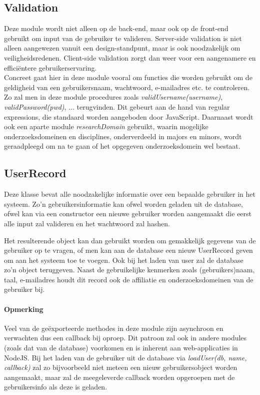\documentclass{article}
\begin{document}
\subsection{Validation}

Deze module wordt niet alleen op de back-end, maar ook op de front-end gebruikt om input van de gebruiker te valideren. Server-side validation is niet alleen aangewezen vanuit een design-standpunt, maar is ook noodzakelijk om veiligheidsredenen. Client-side validation zorgt dan weer voor een aangenamere en effici\"entere gebruikerservaring. \\

Concreet gaat hier in deze module vooral om functies die worden gebruikt om de geldigheid van een gebruikersnaam, wachtwoord, e-mailadres etc. te controleren. Zo zal men in deze module procedures zoals \textit{validUsername(username)}, \textit{validPassword(pwd)}, ... terugvinden. Dit gebeurt aan de hand van regular expressions, die standaard worden aangeboden door JavaScript. Daarnaast wordt ook een aparte module \textit{researchDomain} gebruikt, waarin mogelijke onderzoeksdomeinen en disciplines, onderverdeeld in majors en minors, wordt geraadpleegd om na te gaan of het opgegeven onderzoeksdomein wel bestaat.

\subsection{UserRecord}

Deze klasse bevat alle noodzakelijke informatie over een bepaalde gebruiker in het systeem. Zo'n gebruikersinformatie kan ofwel worden geladen uit de database, ofwel kan via een constructor een nieuwe gebruiker worden aangemaakt die eerst alle input zal valideren en het wachtwoord zal hashen.

Het resulterende object kan dan gebruikt worden om gemakkelijk gegevens van de gebruiker op te vragen, of men kan aan de database een nieuw UserRecord geven om aan het systeem toe te voegen. Ook bij het laden van user zal de database zo'n object teruggeven. Naast de gebruikelijke kenmerken zoals (gebruikers)naam, taal, e-mailadres houdt dit record ook de affiliatie en onderzoeksdomeinen van de gebruiker bij.

\paragraph{Opmerking}
Veel van de ge\"exporteerde methodes in deze module zijn asynchroon en verwachten dus een callback bij oproep. Dit patroon zal ook in andere modules (zoals dat van de database) voorkomen en is inherent aan web-applicaties in NodeJS. Bij het laden van de gebruiker uit de database via \textit{loadUser(db, name, callback)} zal zo bijvoorbeeld niet meteen een nieuw gebruikersobject worden aangemaakt, maar zal de meegeleverde callback worden opgeroepen met de gebruikersinfo als deze is geladen. 
\end{document}
